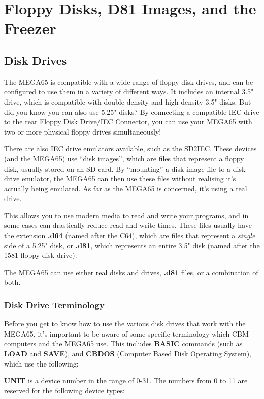 \chapter{Floppy Disks, D81 Images, and the Freezer}
\label{cha:freezer}


\section{Disk Drives}
The MEGA65 is compatible with a wide range of floppy disk drives, and can be configured to use them in a variety
of different ways. It includes an internal 3.5" drive, which is compatible with double density and high density
3.5" disks. But did you know you can also use 5.25" disks? By connecting a compatible IEC drive to the rear
Floppy Disk Drive/IEC Connector, you can use your MEGA65 with two or more physical floppy drives simultaneously!

There are also IEC drive emulators available, such as the SD2IEC. These devices
(and the MEGA65) use ``disk images'', which are files that represent a floppy disk, usually stored on an SD card.
By ``mounting'' a disk image file to a disk drive emulator, the MEGA65 can then use these files without realising it's
actually being emulated. As far as the MEGA65 is concerned, it's using a real drive.

This allows you to use modern media to read and write your programs, and in some cases can drastically reduce
read and write times. These files usually have the extension {\bf .d64} (named after the C64), which are files that
represent a {\it single} side of a 5.25" disk, or {\bf .d81}, which represents an entire 3.5" disk (named after the
1581 floppy disk drive).

The MEGA65 can use either real disks and drives, {\bf .d81} files, or a combination of both.

\subsection{Disk Drive Terminology}
Before you get to know how to use the various disk drives that work with the MEGA65, it's important to be aware
of some specific terminology which CBM computers and the MEGA65 use. This includes {\bf BASIC} commands (such as
{\bf LOAD} and {\bf SAVE}), and {\bf CBDOS} (Computer Based Disk Operating System), which use the following:

{\bf UNIT} is a device number in the range of 0-31.
The numbers from 0 to 11 are reserved for the following device types:

